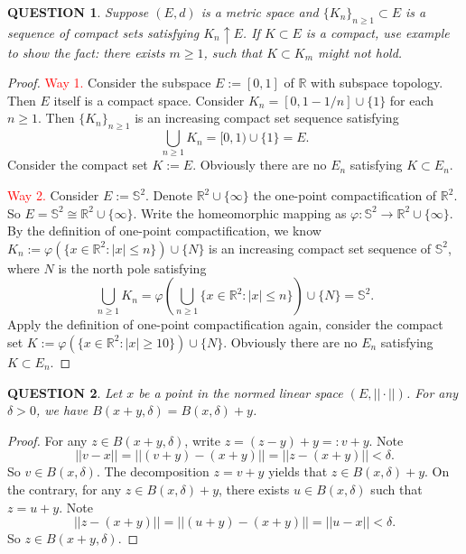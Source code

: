 \documentclass[12pt]{article}
\renewcommand{\(}{\left(}%
\renewcommand{\)}{\right)}%
\renewcommand{\[}{\left[}%
\renewcommand{\]}{\right]}%
\renewcommand{\r}{\mathbb{R}}
\newtheorem{question}{QUESTION}[section]}
\newtheorem{proof}{Proof.}}
\begin{document}
  \begin{question}
  	Suppose $(E,d)$ is a metric space and $\{K_n\}_{n\geq 1}\subset E$ is a sequence of compact sets satisfying $K_n\uparrow E$. If $K\subset E$ is a compact, use example to show the fact: there exists $m\geq 1$, such that $K\subset K_m$ might not hold.
  \end{question}
  \begin{proof}
  	\textcolor{red}{\sffamily Way 1.} Consider the subspace $E:=[0,1]$ of $\r$ with subspace topology. Then $E$ itself is a compact space. Consider $K_n=[0,1-1/n]\cup\{1\}$ for each $n\geq 1$. Then $\{K_n\}_{n\geq 1}$ is an increasing compact set sequence satisfying
  	\begin{equation*}
  		\bigcup_{n\geq 1}K_n=[0,1)\cup\{1\}=E.
  	\end{equation*} 
  	Consider the compact set $K:=E$. Obviously there are no $E_n$ satisfying $K\subset E_n$. 
  	
  	\textcolor{red}{\sffamily Way 2.} Consider $E:=\mathbb{S}^2$. Denote $\r^2\cup\{\infty\}$ the one-point compactification of $\r^2$. So $E=\mathbb{S}^2\cong \r^2\cup\{\infty\}$. Write the homeomorphic mapping as $\varphi:\mathbb{S}^2\to \r^2\cup\{\infty\}$. By the definition of one-point compactification, we know $K_n:=\varphi(\{x\in\r^2:|x|\leq  n\})\cup\{N\}$ is an increasing compact set sequence of $\mathbb{S}^2$, where $N$ is the north pole satisfying 
  	\begin{equation*}
  		\bigcup_{n\geq 1}K_n=\varphi\(\bigcup_{n\geq 1} \{x\in\r^2:|x|\leq  n\}\)\cup\{N\}=\mathbb{S}^2.
  	\end{equation*}
  	Apply the definition of one-point compactification again, consider the compact set $K:=\varphi(\{x\in\r^2:|x|\geq 10 \})\cup\{N\}$. Obviously there are no $E_n$ satisfying $K\subset E_n$.
  \end{proof}
  
  \begin{question}
  	Let $x$ be a point in the normed linear space $(E,||\cdot||)$. For any $\delta>0$, we have $B(x+y,\delta)=B(x,\delta)+y$. 
  \end{question}
  \begin{proof}
  	For any $z\in B(x+y,\delta)$, write $z=(z-y)+y=:v+y$. Note 
  	\begin{equation*}
  		||v-x||=||(v+y)-(x+y)||=||z-(x+y)||<\delta.
  	\end{equation*}
  	So $v\in B(x,\delta)$. The decomposition $z=v+y$ yields that $z\in B(x,\delta)+y$.
  	 On the contrary, for any $z\in B(x,\delta)+y$, there exists $u\in B(x,\delta)$ such that $z=u+y$. Note
  	\begin{equation*}
  		||z-(x+y)||=||(u+y)-(x+y)||=||u-x||<\delta.
  	\end{equation*}
  	So $z\in B(x+y,\delta)$. 
  \end{proof}
  
\end{document}
